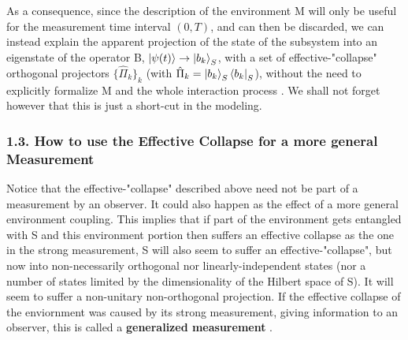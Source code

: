 \documentclass[11pt, a4paper]{article} %
\begin{document}
As a consequence, since the description of the environment M will only be useful for the measurement time interval $(0,T)$, and can then be discarded, we can instead explain the apparent projection of the state of the subsystem into an eigenstate of the operator B, $\ket{\psi(t)}\to \ket{b_k}_S$, with a set of effective-"collapse" orthogonal projectors $\{\hat{\Pi}_k\}_k$ (with $\hat{\Pi}_k=\ket{b_k}_S\bra{b_k}_S$), without the need to explicitly formalize M and the whole interaction process \cite{Durr}. We shall not forget however that this is just a short-cut in the modeling.\vspace{-0.3cm}



\subsubsection*{1.3. How to use the Effective Collapse for a more general Measurement}\vspace{-0.1cm}

Notice that the effective-"collapse" described above need not be part of a measurement by an observer. It could also happen as the effect of a more general environment coupling. This implies that if part of the environment gets entangled with S and this environment portion then suffers an effective collapse as the one in the strong measurement, S will also seem to suffer an effective-"collapse", but now into non-necessarily orthogonal nor linearly-independent states (nor a number of states limited by the dimensionality of the Hilbert space of S). It will seem to suffer a non-unitary non-orthogonal projection. If the effective collapse of the enviornment was caused by its strong measurement, giving information to an observer, this is called a {\bf generalized measurement} \cite{Generalized, Durr}. 
\end{document}
